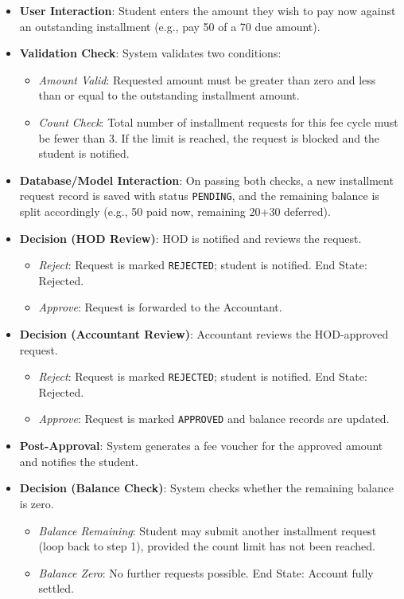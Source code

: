 \begin{itemize}
    \item \textbf{User Interaction}: Student enters the amount they wish to pay now against an outstanding installment (e.g., pay 50 of a 70 due amount).
    \item \textbf{Validation Check}: System validates two conditions:
    \begin{itemize}
        \item \textit{Amount Valid}: Requested amount must be greater than zero and less than or equal to the outstanding installment amount.
        \item \textit{Count Check}: Total number of installment requests for this fee cycle must be fewer than 3. If the limit is reached, the request is blocked and the student is notified.
    \end{itemize}
    \item \textbf{Database/Model Interaction}: On passing both checks, a new installment request record is saved with status \texttt{PENDING}, and the remaining balance is split accordingly (e.g., 50 paid now, remaining 20+30 deferred).
    \item \textbf{Decision (HOD Review)}: HOD is notified and reviews the request.
    \begin{itemize}
        \item \textit{Reject}: Request is marked \texttt{REJECTED}; student is notified. End State: Rejected.
        \item \textit{Approve}: Request is forwarded to the Accountant.
    \end{itemize}
    \item \textbf{Decision (Accountant Review)}: Accountant reviews the HOD-approved request.
    \begin{itemize}
        \item \textit{Reject}: Request is marked \texttt{REJECTED}; student is notified. End State: Rejected.
        \item \textit{Approve}: Request is marked \texttt{APPROVED} and balance records are updated.
    \end{itemize}
    \item \textbf{Post-Approval}: System generates a fee voucher for the approved amount and notifies the student.
    \item \textbf{Decision (Balance Check)}: System checks whether the remaining balance is zero.
    \begin{itemize}
        \item \textit{Balance Remaining}: Student may submit another installment request (loop back to step 1), provided the count limit has not been reached.
        \item \textit{Balance Zero}: No further requests possible. End State: Account fully settled.
    \end{itemize}
\end{itemize}

